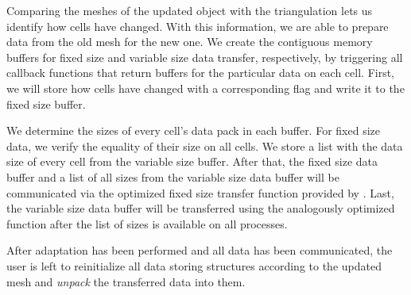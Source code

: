 Comparing the meshes of the updated \pforest{} object with the \dealii{} triangulation lets us identify how cells have changed.
With this information, we are able to prepare data from the old mesh for the new one. We create the contiguous memory buffers for fixed size and variable size data transfer, respectively, by triggering all callback functions that return buffers for the particular data on each cell. First, we will store how cells have changed with a corresponding flag and write it to the fixed size buffer.

We determine the sizes of every cell's data pack in each buffer. For fixed size data, we verify the equality of their size on all cells. We store a list with the data size of every cell from the variable size buffer. After that, the fixed size data buffer and a list of all sizes from the variable size data buffer will be communicated via the optimized fixed size transfer function provided by \pforest{} \parencite{burstedde2018}. Last, the variable size data buffer will be transferred using the analogously optimized function after the list of sizes is available on all processes.



After adaptation has been performed and all data has been communicated, the user is left to reinitialize all data storing structures according to the updated mesh and \textit{unpack} the transferred data into them.

%

